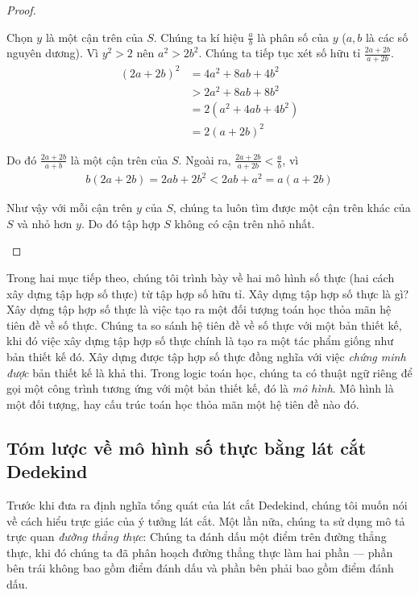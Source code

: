 \begin{proof}
\begin{enumerate}[label={(\roman*)}]
		      Chọn $y$ là một cận trên của $S$. Chúng ta kí hiệu $\frac{a}{b}$ là phân số của $y$ ($a, b$ là các số nguyên dương). Vì $y^{2} > 2$ nên $a^{2} > 2b^{2}$. Chúng ta tiếp tục xét số hữu tỉ $\frac{2a + 2b}{a + 2b}$.
		      \begin{align*}
			      {(2a + 2b)}^{2} & = 4a^{2} + 8ab + 4b^{2}   \\
			                      & > 2a^{2} + 8ab + 8b^{2}   \\
			                      & = 2(a^{2} + 4ab + 4b^{2}) \\
			                      & = 2{(a + 2b)}^{2}
		      \end{align*}

		      Do đó $\frac{2a + 2b}{a + b}$ là một cận trên của $S$. Ngoài ra, $\frac{2a + 2b}{a + 2b} < \frac{a}{b}$, vì
		      \begin{align*}
			      b(2a + 2b) = 2ab + 2b^{2} < 2ab + a^{2} = a(a + 2b)
		      \end{align*}

		      Như vậy với mỗi cận trên $y$ của $S$, chúng ta luôn tìm được một cận trên khác của $S$ và nhỏ hơn $y$. Do đó tập hợp $S$ không có cận trên nhỏ nhất.
	\end{enumerate}
\end{proof}

Trong hai mục tiếp theo, chúng tôi trình bày về hai mô hình số thực (hai cách xây dựng tập hợp số thực) từ tập hợp số hữu tỉ. Xây dựng tập hợp số thực là gì? Xây dựng tập hợp số thực là việc tạo ra một đối tượng toán học thỏa mãn hệ tiên đề về số thực. Chúng ta so sánh hệ tiên đề về số thực với một bản thiết kế, khi đó việc xây dựng tập hợp số thực chính là tạo ra một tác phẩm giống như bản thiết kế đó. Xây dựng được tập hợp số thực đồng nghĩa với việc \textit{chứng minh được} bản thiết kế là khả thi. Trong logic toán học, chúng ta có thuật ngữ riêng để gọi một công trình tương ứng với một bản thiết kế, đó là \textit{mô hình}. Mô hình là một đối tượng, hay cấu trúc toán học thỏa mãn một hệ tiên đề nào đó.

\subsection{Tóm lược về mô hình số thực bằng lát cắt Dedekind}

Trước khi đưa ra định nghĩa tổng quát của lát cắt Dedekind, chúng tôi muốn nói về cách hiểu trực giác của ý tưởng lát cắt. Một lần nữa, chúng ta sử dụng mô tả trực quan \textit{đường thẳng thực}: Chúng ta đánh dấu một điểm trên đường thẳng thực, khi đó chúng ta đã phân hoạch đường thẳng thực làm hai phần --- phần bên trái không bao gồm điểm đánh dấu và phần bên phải bao gồm điểm đánh dấu.

